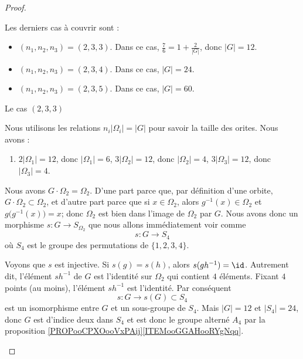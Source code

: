 \begin{proof}
\begin{subproof}
                Les derniers cas à couvrir sont :
                \begin{itemize}
                    \item \( (n_1,n_2,n_3)=(2,3,3)\). Dans ce cas, \( \frac{ 7 }{ 6 }=1+\frac{ 2 }{ | G | }\), donc \( | G |=12\).
                    \item \( (n_1,n_2,n_3)=(2,3,4)\). Dans ce cas, \( | G |=24\).
                    \item \( (n_1,n_2,n_3)=(2,3,5)\). Dans ce cas, \( | G |=60\).
                \end{itemize}
                
            \item[Le cas \( (2,3,3)\)]

                Nous utilisons les relations \( n_i| \Omega_i |=| G |\) pour savoir la taille des orites. Nous avons :
                \begin{enumerate}
                    \item
                        \( 2| \Omega_1 |=12\), donc \( | \Omega_1 |=6\),
                        \( 3| \Omega_2 |=12\), donc \( | \Omega_2 |=4\),
                        \( 3| \Omega_3 |=12\), donc \( | \Omega_3 |=4\).
                \end{enumerate}
                
                Nous avons \( G\cdot \Omega_2=\Omega_2\). D'une part parce que, par définition d'une orbite, \( G\cdot\Omega_2\subset\Omega_2\), et d'autre part parce que si \( x\in\Omega_2\), alors \( g^{-1}(x)\in\Omega_2\) et \( g\big( g^{-1}(x) \big)=x\); donc \( \Omega_2\) est bien dans l'image de \( \Omega_2\) par \( G\). Nous avons donc un morphisme \( s\colon G\to S_{\Omega_2}\) que nous allons immédiatement voir comme
                \begin{equation}
                    s\colon G\to S_4
                \end{equation}
                où \( S_4\) est le groupe des permutations de \( \{ 1,2,3,4 \}\).

                Voyons que \( s\) est injective. Si \( s(g)=s(h)\), alors \( s(gh^{-1})=\id\). Autrement dit, l'élément \( sh^{-1}\) de \( G\) est l'identité sur \( \Omega_2\) qui contient \( 4\) éléments. Fixant \( 4\) points (au moins), l'élément \( sh^{-1}\) est l'identité. Par conséquent
                \begin{equation}
                    s\colon G\to s(G)\subset S_4
                \end{equation}
                est un isomorphisme entre \( G\) et un sous-groupe de \( S_4\). Mais \( | G |=12\) et \( | S_4 |=24\), donc \( G\) est d'indice deux dans \( S_4\) et est donc le groupe alterné \( A_4\) par la proposition \ref{PROPooCPXOooVxPAij}\ref{ITEMooGGAHooRYgNqq}.


\end{subproof}
\end{proof}
